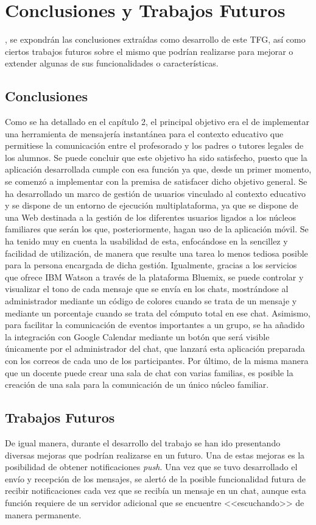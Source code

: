 \chapter{Conclusiones y Trabajos Futuros}
\label{chap:conclusiones}

, se expondrán las conclusiones extraídas como desarrollo de este \acs{TFG}, así como ciertos trabajos futuros sobre el mismo que podrían realizarse para mejorar o extender algunas de sus funcionalidades o características.

\section{Conclusiones}
Como se ha detallado en el capítulo 2, el principal objetivo era el de implementar una herramienta de mensajería instantánea para el contexto educativo que permitiese la comunicación entre el profesorado y los padres o tutores legales de los alumnos. Se puede concluir que este objetivo ha sido satisfecho, puesto que la aplicación desarrollada cumple con esa función ya que, desde un primer momento, se comenzó a implementar con la premisa de satisfacer dicho objetivo general. Se ha desarrollado un marco de gestión de usuarios vinculado al contexto educativo y se dispone de un entorno de ejecución multiplataforma, ya que se dispone de una Web destinada a la gestión de los diferentes usuarios ligados a los núcleos familiares que serán los que, posteriormente, hagan uso de la aplicación móvil. Se ha tenido muy en cuenta la usabilidad de esta, enfocándose en la sencillez y facilidad de utilización, de manera que resulte una tarea lo menos tediosa posible para la persona encargada de dicha gestión. Igualmente, gracias a los servicios que ofrece IBM Watson a través de la plataforma Bluemix, se puede controlar y visualizar el tono de cada mensaje que se envía en los chats, mostrándose al administrador mediante un código de colores cuando se trata de un mensaje y mediante un porcentaje cuando se trata del cómputo total en ese chat. Asimismo, para facilitar la comunicación de eventos importantes a un grupo, se ha añadido la integración con Google Calendar mediante un botón que será visible únicamente por el administrador del chat, que lanzará esta aplicación preparada con los correos de cada uno de los participantes. Por último, de la misma manera que un docente puede crear una sala de chat con varias familias, es posible la creación de una sala para la comunicación de un único núcleo familiar.

\clearpage

\section{Trabajos Futuros}
De igual manera, durante el desarrollo del trabajo se han ido presentando diversas mejoras que podrían realizarse en un futuro. Una de estas mejoras es la posibilidad de obtener notificaciones \textit{push}. Una vez que se tuvo desarrollado el envío y recepción de los mensajes, se alertó de la posible funcionalidad futura de recibir notificaciones cada vez que se recibía un mensaje en un chat, aunque esta función requiere de un servidor adicional que se encuentre <<escuchando>> de manera permanente.